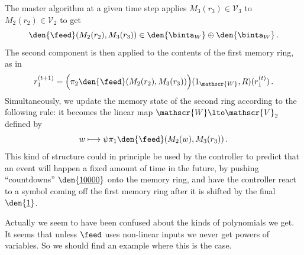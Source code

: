 The master algorithm at a given time step applies $M_3(r_3) \in \mathscr{V}_3$ to $M_2(r_2) \in \mathscr{V}_2$ to get
\[
\den{\feed}( M_2(r_2), M_3(r_3)) \in \den{\binta_W} \oplus \den{\binta_W}\,.
\]
The second component is then applied to the contents of the first memory ring, as in
\[
r_1^{(t+1)} = \Big( \pi_2\den{\feed}( M_2(r_2), M_3(r_3)) \Big)(1_{\mathscr{W}}, R)(r_1^{(t)})\,.
\]
Simultaneously, we update the memory state of the second ring according to the following rule: it becomes the linear map $\mathscr{W} \lto \mathscr{V}_2$ defined by
\[
w \longmapsto \psi \pi_1\den{\feed}( M_2(w), M_3(r_3))\,.
\]
This kind of structure could in principle be used by the controller to predict that an event will happen a fixed amount of time in the future, by pushing ``countdowns'' $\den{\underline{10000}}$ onto the memory ring, and have the controller react to a symbol coming off the first memory ring after it is shifted by the final $\den{\underline{1}}$.

\begin{remark} Actually we seem to have been confused about the kinds of polynomials we get. It seems that unless $\feed$ uses non-linear inputs we never get powers of variables. So we should find an example where this is the case.
\end{remark}